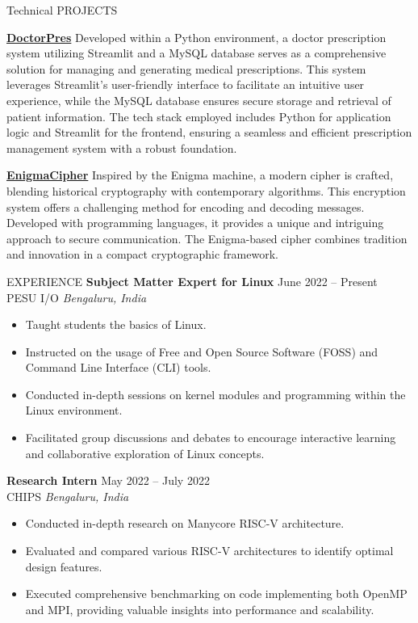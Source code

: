 \documentclass{resume} %
\begin{document}
\begin{rSection}{Technical PROJECTS}
\item \textbf{\href{https://github.com/Adarsh-Liju/DoctorPres}{DoctorPres}} {Developed within a Python environment, a doctor prescription system utilizing Streamlit and a MySQL database serves as a comprehensive solution for managing and generating medical prescriptions. This system leverages Streamlit's user-friendly interface to facilitate an intuitive user experience, while the MySQL database ensures secure storage and retrieval of patient information. The tech stack employed includes Python for application logic and Streamlit for the frontend, ensuring a seamless and efficient prescription management system with a robust foundation.}

\item \textbf{\href{https://github.com/Adarsh-Liju/EnigmaCipher}{EnigmaCipher}} {Inspired by the Enigma machine, a modern cipher is crafted, blending historical cryptography with contemporary algorithms. This encryption system offers a challenging method for encoding and decoding messages. Developed with programming languages, it provides a unique and intriguing approach to secure communication. The Enigma-based cipher combines tradition and innovation in a compact cryptographic framework.}
\end{rSection} 
\vspace{0.25cm}
\begin{rSection}{EXPERIENCE}
\vspace{0.25cm}
\textbf{Subject Matter Expert for Linux } \hfill June 2022 – Present\\
PESU I/O \hfill \textit{Bengaluru, India}
 \begin{itemize}
    \itemsep -3pt {} 
           \item Taught students the basics of Linux.
    \item Instructed on the usage of Free and Open Source Software (FOSS) and Command Line Interface (CLI) tools.
    \item Conducted in-depth sessions on kernel modules and programming within the Linux environment.
    \item Facilitated group discussions and debates to encourage interactive learning and collaborative exploration of Linux concepts.
 \end{itemize}

\textbf{Research Intern} \hfill May 2022 – July 2022\\
CHIPS  \hfill \textit{Bengaluru, India}
 \begin{itemize}
    \itemsep -3pt {} 
      \item Conducted in-depth research on Manycore RISC-V architecture.
  \item Evaluated and compared various RISC-V architectures to identify optimal design features.
  \item Executed comprehensive benchmarking on code implementing both OpenMP and MPI, providing valuable insights into performance and scalability.
     
     
\end{itemize}

\end{rSection} 
\end{document}
